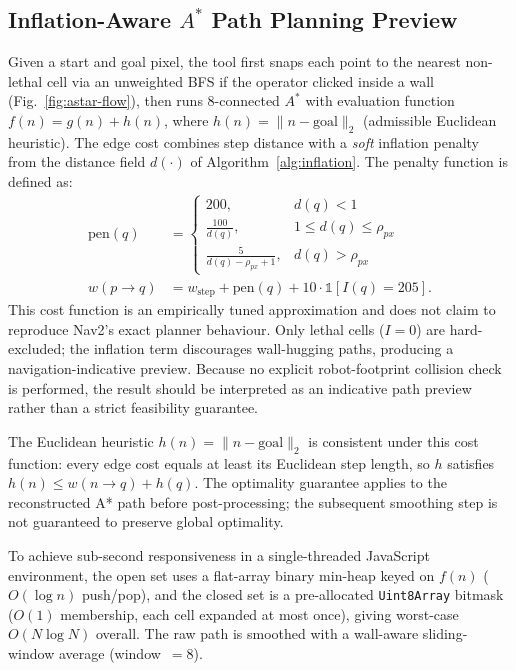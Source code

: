 \documentclass{IEEE_lsens}
\begin{document}
\subsection{Inflation-Aware \boldmath$A^{*}$ Path Planning Preview}
Given a start and goal pixel, the tool first snaps each point to the nearest non-lethal cell via an unweighted BFS if the operator clicked inside a wall (Fig.~\ref{fig:astar-flow}), then runs 8-connected $A^{*}$ \cite{hart1968formal} with evaluation function $f(n) = g(n) + h(n)$, where $h(n) = \lVert n - \text{goal} \rVert_2$ (admissible Euclidean heuristic). The edge cost combines step distance with a \emph{soft} inflation penalty from the distance field $d(\cdot)$ of Algorithm~\ref{alg:inflation}. The penalty function is defined as:
\begin{align}
\text{pen}(q) &=
\begin{cases}
200, & d(q) < 1\\
\frac{100}{d(q)}, & 1 \leq d(q) \leq \rho_{px}\\
\frac{5}{d(q) - \rho_{px} + 1}, & d(q) > \rho_{px}
\end{cases} \\
w(p \!\rightarrow\! q) &= w_{\text{step}} + \text{pen}(q) + 10\cdot\mathbb{1}[I(q)=205].
\end{align}
This cost function is an empirically tuned approximation and does not claim to reproduce Nav2's exact planner behaviour. Only lethal cells ($I=0$) are hard-excluded; the inflation term discourages wall-hugging paths, producing a navigation-indicative preview. Because no explicit robot-footprint collision check is performed, the result should be interpreted as an indicative path preview rather than a strict feasibility guarantee.

The Euclidean heuristic $h(n)=\lVert n-\text{goal}\rVert_2$ is consistent under this cost function: every edge cost equals at least its Euclidean step length, so $h$ satisfies $h(n)\leq w(n\!\rightarrow\!q)+h(q)$. The optimality guarantee applies to the reconstructed A* path before post-processing; the subsequent smoothing step is not guaranteed to preserve global optimality.

To achieve sub-second responsiveness in a single-threaded JavaScript environment, the open set uses a flat-array binary min-heap keyed on $f(n)$ ($O(\log n)$ push/pop), and the closed set is a pre-allocated \texttt{Uint8Array} bitmask ($O(1)$ membership, each cell expanded at most once), giving worst-case $O(N\log N)$ overall. The raw path is smoothed with a wall-aware sliding-window average (window~$=8$).
\end{document}
